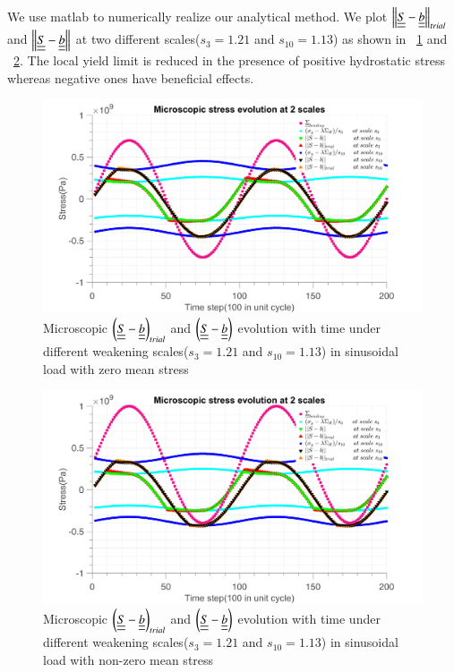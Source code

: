 \documentclass[3p,times,number,review]{elsarticle}
\newcommand{\figref}[1]{\figurename~\ref{#1}}
\begin{document}
We use matlab to numerically realize our analytical method. We plot $\left\|  \uline{\uline{S}}-\uline{\uline{b}}\right\|_{trial}$ and $\left\|  \uline{\uline{S}}-\uline{\uline{b}}\right\|$ at two different scales($s_{3}=1.21$ and $s_{10}=1.13$) as shown in \figref{fig.trialsin0} and \figref{fig.trialsinm}. The local yield limit is reduced in the presence of positive hydrostatic stress whereas negative ones have beneficial effects.
\begin{figure}[!h]
\centering
\includegraphics[width=\textwidth]{figures//trialsin_0.png} 
\caption{Microscopic $\left(  \uline{\uline{S}}-\uline{\uline{b}}\right)_{trial}$ and $\left( \uline{\uline{S}}-\uline{\uline{b}}\right)$ evolution with time under different weakening scales($s_{3}=1.21$ and $s_{10}=1.13$) in sinusoidal load with zero mean stress}
\label{fig.trialsin0}
\end{figure}
\begin{figure}[!h]
\centering
\includegraphics[width=\textwidth]{figures//trialsin_m.png} 
\caption{Microscopic $\left(  \uline{\uline{S}}-\uline{\uline{b}}\right)_{trial}$ and $\left( \uline{\uline{S}}-\uline{\uline{b}}\right)$ evolution with time under different weakening scales($s_{3}=1.21$ and $s_{10}=1.13$) in sinusoidal load with non-zero mean stress}
\label{fig.trialsinm}
\end{figure}
\end{document}
